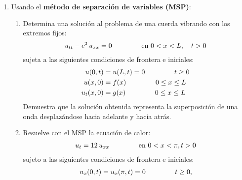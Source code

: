 \documentclass[12pt]{article}
\begin{document}
\begin{enumerate}
\item Usando el \textbf{método de separación de variables (MSP)}:
\begin{enumerate}
\item Determina una solución al problema de una cuerda vibrando con los extremos fijos:
\begin{align*}
u_{tt} - c^{2} \, u_{xx} = 0 \hspace{1.5cm} \text{en } 0 < x < L, \quad t > 0
\end{align*}
sujeta a las siguientes condiciones de frontera e iniciales:
\begin{align*}
    u (0, t) &= u (L, t) = 0 \hspace{1.5cm} t \geq 0 \\
    u (x, 0) &= f (x) \hspace{1.5cm} 0 \leq x \leq L \\
    u_{t} (x, 0) &= g (x) \hspace{1.5cm} 0 \leq x \leq L    
\end{align*}
Demuestra que la solución obtenida representa la superposición de una onda desplazándose hacia adelante y hacia atrás.
\item Resuelve con el MSP la ecuación de calor:
\begin{align*}
    u_{t} = 12 \, u_{xx} \hspace{1.5cm} \text{en } 0 < x < \pi, t > 0
\end{align*}
sujeto a las siguientes condiciones de frontera e iniciales:
\begin{align*}
    u_{x} (0, t) &= u_{x} (\pi, t) = 0 \hspace{1.5cm} t \geq 0, \\

\end{align*}
\end{enumerate}
\end{enumerate}
\end{document}

